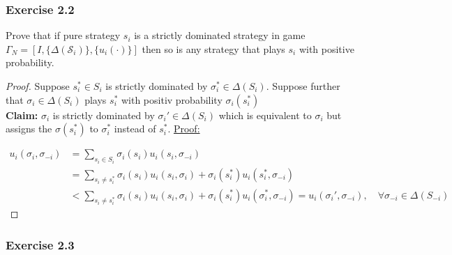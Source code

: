 \documentclass[12pt]{extreport} %
\theoremstyle{named}
\theoremstyle{itshape}
\theoremstyle{normal}
\begin{document}
\subsubsection*{Exercise 2.2}

Prove that if pure strategy $s_i$ is a strictly dominated strategy in game $\Gamma_N = [I, \{ \Delta(\mathcal{S}_i)\}, \{u_i(\cdot)\}]$ then so is any strategy that plays $s_i$ with positive probability.

\begin{proof}
	Suppose $s_i^* \in S_i$ is strictly dominated by $\sigma_i^{*} \in \Delta(S_i)$. Suppose further that $\sigma_i \in \Delta(S_i)$ plays $s_i^*$ with positiv probability $\sigma_i(s_i^*)$ ~\\

	\textbf{Claim:} $\sigma_i$ is strictly dominated by $\sigma_i' \in \Delta(S_i)$ which is equivalent to $\sigma_i$ but assigns the $\sigma(s_i^*)$ to $\sigma_i^*$ instead of $s_i^*$. \underline{Proof:}
	
		\begin{align*}	
			u_i(\sigma_i, \sigma_{-i}) & = \sum_{s_i \in S_i} \sigma_i(s_i) u_i(s_i, \sigma_{-i}) \\ 
				& = \sum_{s_i \neq s_i^*} \sigma_i(s_i) u_i(s_i, \sigma_i) + \sigma_i(s_i^*) u_i(s_i^*, \sigma_{-i}) \\
				& <\sum_{s_i \neq s_i^*} \sigma_i(s_i) u_i(s_i, \sigma_i) + \sigma_i(s_i^*) u_i(\sigma_i^*, \sigma_{-i}) = u_i(\sigma_i', \sigma_{-i}), \quad \forall \sigma_{-i} \in \Delta(S_{-i})
		\end{align*}
\end{proof}

\subsubsection*{Exercise 2.3}
\end{document}
